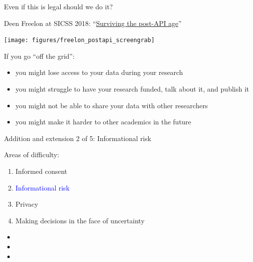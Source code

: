 \documentclass{beamer}
\begin{document}
\begin{frame}

Even if this is legal should we do it? \pause

Deen Freelon at SICSS 2018: ``\textcolor{blue}{\href{https://www.youtube.com/watch?v=GWpCHh54pXU}{Surviving the post-API age}}''

\begin{center}
\texttt{[image: figures/freelon\_postapi\_screengrab]}
\end{center}


If you go ``off the grid'': \pause
\begin{itemize}
\item you might lose access to your data during your research
\pause
\item you might struggle to have your research funded, talk about it, and publish it
\pause
\item you might not be able to share your data with other researchers
\pause
\item you might make it harder to other academics in the future
\end{itemize}

\end{frame}
\begin{frame}

\begin{center}
Addition and extension 2 of 5: Informational risk
\end{center}

\end{frame}
\begin{frame}

Areas of difficulty:
\begin{enumerate}
\item Informed consent
\item \textcolor{blue}{Informational risk}
\item Privacy
\item Making decisions in the face of uncertainty
\end{enumerate}

\end{frame}
\begin{frame}

\begin{itemize}
\item {}
\item {}
\item {}
\end{itemize}

\end{frame}
\end{document}
